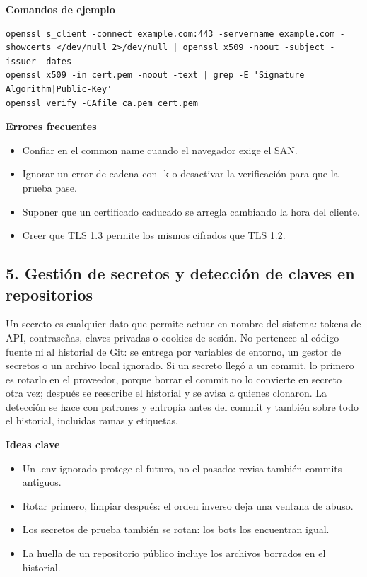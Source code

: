 \documentclass[11pt,a4paper]{article}
\begin{document}
\textbf{Comandos de ejemplo}

\begin{lstlisting}[style=estiloCodigo]
openssl s_client -connect example.com:443 -servername example.com -showcerts </dev/null 2>/dev/null | openssl x509 -noout -subject -issuer -dates
openssl x509 -in cert.pem -noout -text | grep -E 'Signature Algorithm|Public-Key'
openssl verify -CAfile ca.pem cert.pem
\end{lstlisting}

\textbf{Errores frecuentes}

\begin{itemize}[leftmargin=1.4em,itemsep=2pt,topsep=3pt]
  \item Confiar en el common name cuando el navegador exige el SAN.
  \item Ignorar un error de cadena con -k o desactivar la verificación para que la prueba pase.
  \item Suponer que un certificado caducado se arregla cambiando la hora del cliente.
  \item Creer que TLS 1.3 permite los mismos cifrados que TLS 1.2.
\end{itemize}


\subsection{5. Gestión de secretos y detección de claves en repositorios}

Un secreto es cualquier dato que permite actuar en nombre del sistema: tokens de API, contraseñas, claves privadas o cookies de sesión. No pertenece al código fuente ni al historial de Git: se entrega por variables de entorno, un gestor de secretos o un archivo local ignorado. Si un secreto llegó a un commit, lo primero es rotarlo en el proveedor, porque borrar el commit no lo convierte en secreto otra vez; después se reescribe el historial y se avisa a quienes clonaron. La detección se hace con patrones y entropía antes del commit y también sobre todo el historial, incluidas ramas y etiquetas.

\textbf{Ideas clave}

\begin{itemize}[leftmargin=1.4em,itemsep=2pt,topsep=3pt]
  \item Un .env ignorado protege el futuro, no el pasado: revisa también commits antiguos.
  \item Rotar primero, limpiar después: el orden inverso deja una ventana de abuso.
  \item Los secretos de prueba también se rotan: los bots los encuentran igual.
  \item La huella de un repositorio público incluye los archivos borrados en el historial.
\end{itemize}
\end{document}

